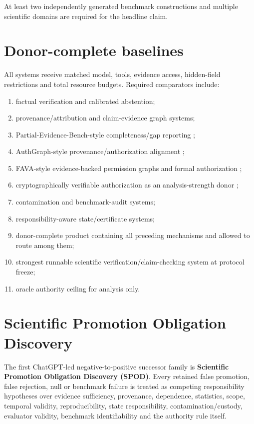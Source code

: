 \documentclass[11pt]{article}
\begin{document}
At least two independently generated benchmark constructions and multiple scientific domains are required for the headline claim.

\section{Donor-complete baselines}
All systems receive matched model, tools, evidence access, hidden-field restrictions and total resource budgets. Required comparators include:
\begin{enumerate}
    \item factual verification and calibrated abstention;
    \item provenance/attribution and claim-evidence graph systems;
    \item Partial-Evidence-Bench-style completeness/gap reporting \cite{partial2026};
    \item AuthGraph-style provenance/authorization alignment \cite{authgraph2026};
    \item FAVA-style evidence-backed permission graphs and formal authorization \cite{fava2026};
    \item cryptographically verifiable authorization as an analysis-strength donor \cite{cva2026};
    \item contamination and benchmark-audit systems;
    \item responsibility-aware state/certificate systems;
    \item donor-complete product containing all preceding mechanisms and allowed to route among them;
    \item strongest runnable scientific verification/claim-checking system at protocol freeze;
    \item oracle authority ceiling for analysis only.
\end{enumerate}

\section{Scientific Promotion Obligation Discovery}
The first ChatGPT-led negative-to-positive successor family is \textbf{Scientific Promotion Obligation Discovery (SPOD)}. Every retained false promotion, false rejection, null or benchmark failure is treated as competing responsibility hypotheses over evidence sufficiency, provenance, dependence, statistics, scope, temporal validity, reproducibility, state responsibility, contamination/custody, evaluator validity, benchmark identifiability and the authority rule itself.
\end{document}
